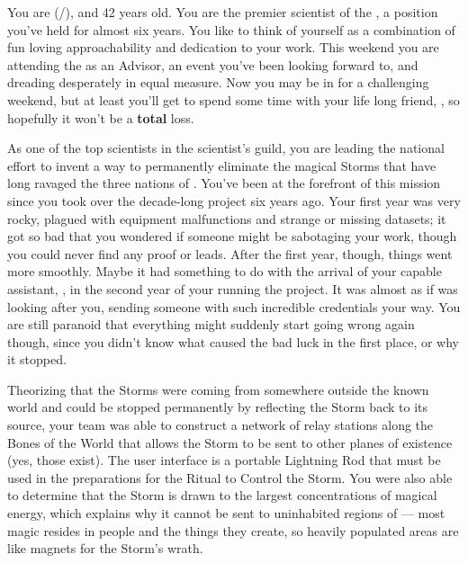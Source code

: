 \documentclass[char]{GL2020}
\begin{document}
\name{\cHeadScientist{}}

You are \cHeadScientist{\full} (\cHeadScientist{\they}/\cHeadScientist{\them}), and 42 years old. You are the premier scientist of the \pTech{}, a position you've held for almost six years. You like to think of yourself as a combination of fun loving approachability and dedication to your work. This weekend you are attending the \pSchool{} as an Advisor, an event you've been looking forward to, and dreading desperately in equal measure. Now you may be in for a challenging weekend, but at least you'll get to spend some time with your life long friend, \cChupInventor{\full}, so hopefully it won’t be a \textbf{total} loss.

As one of the top scientists in the \pTech{} scientist's guild, you are leading the national effort to invent a way to permanently eliminate the magical Storms that have long ravaged the three nations of \pEarth{}.  You've been at the forefront of this mission since you took over the decade-long project six years ago. Your first year was very rocky, plagued with equipment malfunctions and strange or missing datasets; it got so bad that you wondered if someone might be sabotaging your work, though you could never find any proof or leads. After the first year, though, things went more smoothly. Maybe it had something to do with the arrival of your capable assistant, \cAssistantScientist{\full}, in the second year of your running the project. It was almost as if \cTechGod{} was looking after you, sending someone with such incredible credentials your way. You are still paranoid that everything might suddenly start going wrong again though, since you didn’t know what caused the bad luck in the first place, or why it stopped.

Theorizing that the Storms were coming from somewhere outside the known world and could be stopped permanently by reflecting the Storm back to its source, your team was able to construct a network of relay stations along the Bones of the World that allows the Storm to be sent to other planes of existence (yes, those exist). The user interface is a portable Lightning Rod that must be used in the preparations for the Ritual to Control the Storm. You were also able to determine that the Storm is drawn to the largest concentrations of magical energy, which explains why it cannot be sent to uninhabited regions of \pEarth{} — most magic resides in people and the things they create, so heavily populated areas are like magnets for the Storm’s wrath. 
\end{document}
